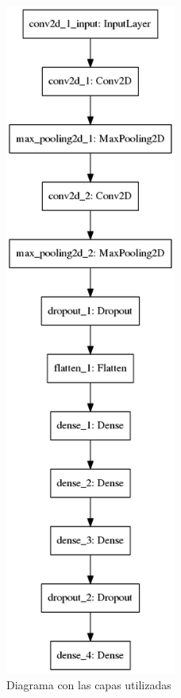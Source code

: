 \begin{figure}[H]
\centering
\includegraphics[width=0.5\textwidth]{../images/model}
\caption{Diagrama con las capas utilizadas}
\label{fig:model}
\end{figure}








